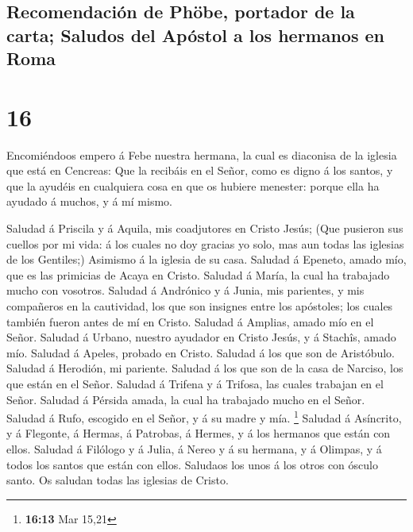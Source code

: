 \hypertarget{recomendaciuxf3n-de-phuxf6be-portador-de-la-carta-saludos-del-apuxf3stol-a-los-hermanos-en-roma}{%
\subsection{Recomendación de Phöbe, portador de la carta; Saludos del
Apóstol a los hermanos en
Roma}\label{recomendaciuxf3n-de-phuxf6be-portador-de-la-carta-saludos-del-apuxf3stol-a-los-hermanos-en-roma}}

\hypertarget{section-15}{%
\section{16}\label{section-15}}

 Encomiéndoos empero á Febe nuestra hermana, la cual es
diaconisa de la iglesia que está en Cencreas:  Que la
recibáis en el Señor, como es digno á los santos, y que la ayudéis en
cualquiera cosa en que os hubiere menester: porque ella ha ayudado á
muchos, y á mí mismo.

 Saludad á Priscila y á Aquila, mis coadjutores en Cristo
Jesús;  (Que pusieron sus cuellos por mi vida: á los
cuales no doy gracias yo solo, mas aun todas las iglesias de los
Gentiles;)  Asimismo á la iglesia de su casa. Saludad á
Epeneto, amado mío, que es las primicias de Acaya en Cristo.
 Saludad á María, la cual ha trabajado mucho con vosotros.
 Saludad á Andrónico y á Junia, mis parientes, y mis
compañeros en la cautividad, los que son insignes entre los apóstoles;
los cuales también fueron antes de mí en Cristo.  Saludad
á Amplias, amado mío en el Señor.  Saludad á Urbano,
nuestro ayudador en Cristo Jesús, y á Stachîs, amado mío.
 Saludad á Apeles, probado en Cristo. Saludad á los que
son de Aristóbulo.  Saludad á Herodión, mi pariente.
Saludad á los que son de la casa de Narciso, los que están en el Señor.
 Saludad á Trifena y á Trifosa, las cuales trabajan en el
Señor. Saludad á Pérsida amada, la cual ha trabajado mucho en el Señor.
 Saludad á Rufo, escogido en el Señor, y á su madre y
mía. \footnote{\textbf{16:13} Mar 15,21}  Saludad á
Asíncrito, y á Flegonte, á Hermas, á Patrobas, á Hermes, y á los
hermanos que están con ellos.  Saludad á Filólogo y á
Julia, á Nereo y á su hermana, y á Olimpas, y á todos los santos que
están con ellos.  Saludaos los unos á los otros con
ósculo santo. Os saludan todas las iglesias de Cristo.

